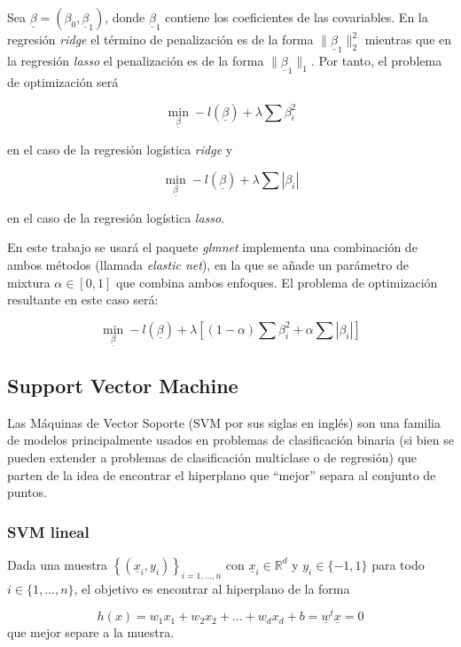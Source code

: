 \documentclass[12pt,a4paper,]{book}
\numberwithin{dummy}{section}
\theoremstyle{ocrenumbox}
\theoremstyle{blacknumex}
\theoremstyle{blacknumbox}
\theoremstyle{ocrenum}
\theoremstyle{ocrenum}
\begin{document}
Sea \(\underline \beta = \left( \beta_0, \underline \beta_1 \right)\),
donde \(\underline \beta_1\) contiene los coeficientes de las
covariables. En la regresión \emph{ridge} el término de penalización es
de la forma \(\| \underline \beta_1 \|^2_2\) mientras que en la
regresión \emph{lasso} el penalización es de la forma
\(\| \underline \beta_1 \|_1\). Por tanto, el problema de optimización
será

\[\min_{\underline \beta} -l(\underline \beta)  + \lambda \sum \beta_i^2 \]

en el caso de la regresión logística \emph{ridge} y

\[\min_{\underline \beta} -l(\underline \beta)  + \lambda \sum |\beta_i|\]

en el caso de la regresión logística \emph{lasso}.

En este trabajo se usará el paquete \emph{glmnet} implementa una
combinación de ambos métodos (llamada \emph{elastic net}), en la que se
añade un parámetro de mixtura \(\alpha \in \left[0,1\right]\) que
combina ambos enfoques. El problema de optimización resultante en este
caso será:

\[\min_{\underline \beta} -l(\underline \beta)  + \lambda \left[(1-\alpha)\sum \beta_i^2 + \alpha \sum |\beta_i| \right]\]

\hypertarget{support-vector-machine}{%
\subsection{Support Vector Machine}\label{support-vector-machine}}

Las Máquinas de Vector Soporte (SVM por sus siglas en inglés) son una
familia de modelos principalmente usados en problemas de clasificación
binaria (si bien se pueden extender a problemas de clasificación
multiclase o de regresión) que parten de la idea de encontrar el
hiperplano que ``mejor'' separa al conjunto de puntos.

\hypertarget{svm-lineal}{%
\subsubsection{SVM lineal}\label{svm-lineal}}

Dada una muestra \(\left\{(\underline x_i,y_i) \right\}_{i=1,...,n}\)
con \(\underline x_i \in \mathbb{R}^d\) y \(y_i \in \{-1,1\}\) para todo
\(i \in \{1,...,n\}\), el objetivo es encontrar al hiperplano de la
forma

\[h(x) = w_1x_1 +w_2x_2+...+w_dx_d +b = \underline w^t \underline x = 0 \]
que mejor separe a la muestra.
\end{document}
